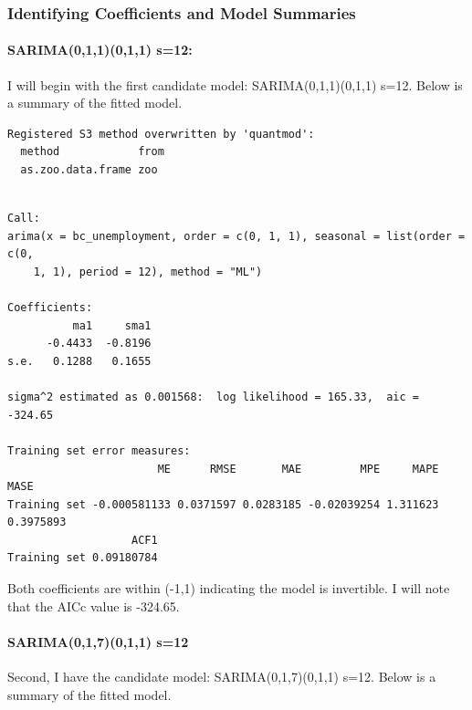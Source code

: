 \documentclass[
  letterpaper,
  DIV=11,
  numbers=noendperiod]{scrartcl}
\let\oldparagraph\paragraph
\renewcommand{\paragraph}[1]{\oldparagraph{#1}\mbox{}}
\begin{document}
\hypertarget{identifying-coefficients-and-model-summaries}{%
\subsubsection{Identifying Coefficients and Model
Summaries}\label{identifying-coefficients-and-model-summaries}}

\hypertarget{sarima011011-s12}{%
\paragraph{SARIMA(0,1,1)(0,1,1) s=12:}\label{sarima011011-s12}}

I will begin with the first candidate model: SARIMA(0,1,1)(0,1,1) s=12.
Below is a summary of the fitted model.

\begin{verbatim}
Registered S3 method overwritten by 'quantmod':
  method            from
  as.zoo.data.frame zoo 
\end{verbatim}

\begin{verbatim}

Call:
arima(x = bc_unemployment, order = c(0, 1, 1), seasonal = list(order = c(0, 
    1, 1), period = 12), method = "ML")

Coefficients:
          ma1     sma1
      -0.4433  -0.8196
s.e.   0.1288   0.1655

sigma^2 estimated as 0.001568:  log likelihood = 165.33,  aic = -324.65

Training set error measures:
                       ME      RMSE       MAE         MPE     MAPE      MASE
Training set -0.000581133 0.0371597 0.0283185 -0.02039254 1.311623 0.3975893
                   ACF1
Training set 0.09180784
\end{verbatim}

Both coefficients are within (-1,1) indicating the model is invertible.
I will note that the AICc value is -324.65.

\hypertarget{sarima017011-s12}{%
\paragraph{SARIMA(0,1,7)(0,1,1) s=12}\label{sarima017011-s12}}

Second, I have the candidate model: SARIMA(0,1,7)(0,1,1) s=12. Below is
a summary of the fitted model.
\end{document}
